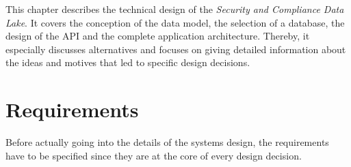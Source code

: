 
This chapter describes the technical design of the \textit{Security and Compliance Data Lake}. It covers the conception of the data model, the selection of a database, the design of the API and the complete application architecture. Thereby, it especially discusses alternatives and focuses on giving detailed information about the ideas and motives that led to specific design decisions.

\section{Requirements} \label{sec:Requirements}
Before actually going into the details of the systems design, the requirements have to be specified since they are at the core of every design decision.  

